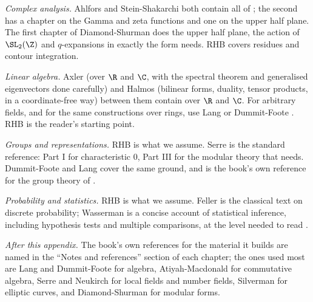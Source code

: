 \emph{Complex analysis.} Ahlfors \cite{Ahlfors79} and Stein-Shakarchi \cite{SteinShakarchi03} both
contain all of ; the second has a chapter on the Gamma and zeta functions
and one on the upper half plane. The first chapter of Diamond-Shurman \cite{DiamondShurman} does the
upper half plane, the action of $\SL_2(\Z)$ and $q$-expansions in exactly the form
 needs. RHB \cite[Chapters 24 and 25]{RHB06} covers residues and contour
integration.

\emph{Linear algebra.} Axler \cite{Axler15} (over $\R$ and $\C$, with the spectral theorem and
generalised eigenvectors done carefully) and Halmos \cite{Halmos74} (bilinear forms, duality,
tensor products, in a coordinate-free way) between them contain  over
$\R$ and $\C$. For arbitrary fields, and for the same constructions over rings, use Lang
\cite[Chapters XIII to XVI]{Lang} or Dummit-Foote \cite[Chapters 11 and 12, and Section
10.4]{DummitFoote}. RHB \cite[Chapter 8]{RHB06} is the reader's starting point.

\emph{Groups and representations.} RHB \cite[Chapters 28 and 29]{RHB06} is what we assume. Serre
\cite{SerreLinearReps} is the standard reference: Part I for characteristic $0$, Part III for the
modular theory that  needs. Dummit-Foote \cite[Chapters 18 and 19]{DummitFoote} and
Lang \cite[Chapter XVIII]{Lang} cover the same ground, and \cite[Chapters 1 to 6]{DummitFoote} is
the book's own reference for the group theory of .

\emph{Probability and statistics.} RHB \cite[Chapters 30 and 31]{RHB06} is what we assume. Feller
\cite{Feller68} is the classical text on discrete probability; Wasserman \cite{Wasserman04} is a
concise account of statistical inference, including hypothesis tests and multiple comparisons, at
the level needed to read .

\emph{After this appendix.} The book's own references for the material it builds are named in the
``Notes and references'' section of each chapter; the ones used most are Lang \cite{Lang} and
Dummit-Foote \cite{DummitFoote} for algebra, Atiyah-Macdonald \cite{AtiyahMacdonald} for
commutative algebra, Serre \cite{SerreLocalFields} and Neukirch \cite{Neukirch} for local fields and
number fields, Silverman \cite{SilvermanAEC,SilvermanATAEC} for elliptic curves, and
Diamond-Shurman \cite{DiamondShurman} for modular forms.
